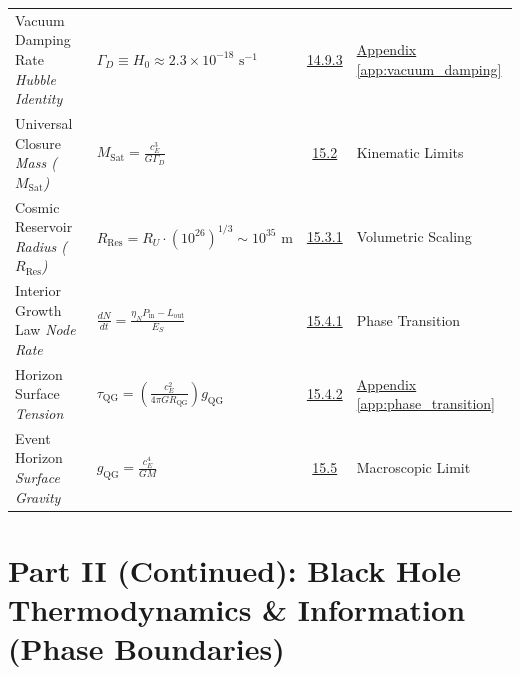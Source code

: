 \begin{longtable}{@{} p{4.5cm} p{6cm} c p{4cm} @{}}
Vacuum Damping Rate \newline \textit{Hubble Identity} & $\Gamma_D \equiv H_0 \approx 2.3 \times 10^{-18} \text{ s}^{-1}$ & \hyperref[sec:14.9.3]{14.9.3} & \hyperref[app:vacuum_damping]{Appendix \ref*{app:vacuum_damping}} \\

Universal Closure \newline \textit{Mass ($M_{\text{Sat}}$)} & $M_{\text{Sat}} = \frac{c_E^3}{G \Gamma_D}$ & \hyperref[sec:15.2]{15.2} & Kinematic Limits \\

Cosmic Reservoir \newline \textit{Radius ($R_{\text{Res}}$)} & $R_{\text{Res}} = R_U \cdot (10^{26})^{1/3} \sim 10^{35} \text{ m}$ & \hyperref[sec:15.3.1]{15.3.1} & Volumetric Scaling \\

Interior Growth Law \newline \textit{Node Rate} & $\frac{dN}{dt} = \frac{\eta_N P_{\text{in}} - L_{\text{out}}}{E_S}$ & \hyperref[sec:15.4.1]{15.4.1} & Phase Transition \\

Horizon Surface \newline \textit{Tension} & $\tau_{\text{QG}} = \left(\frac{c_E^2}{4\pi G R_{\text{QG}}}\right) g_{\text{QG}}$ & \hyperref[sec:15.4.2]{15.4.2} & \hyperref[app:phase_transition]{Appendix \ref*{app:phase_transition}} \\

Event Horizon \newline \textit{Surface Gravity} & $g_{\text{QG}} = \frac{c_E^4}{GM}$ & \hyperref[sec:15.5]{15.5} & Macroscopic Limit \\

\bottomrule
\end{longtable}

\vspace{1cm}

\section*{Part II (Continued): Black Hole Thermodynamics \& Information (Phase Boundaries)}

